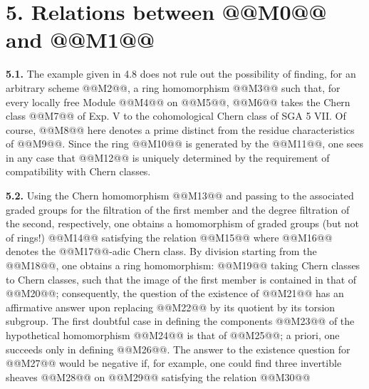 \section*{5. Relations between @@M0@@ and @@M1@@}

\textbf{5.1.} The example given in 4.8 does not rule out the possibility of finding, for an arbitrary scheme @@M2@@, a ring homomorphism
@@M3@@
such that, for every locally free Module @@M4@@ on @@M5@@, @@M6@@ takes the Chern class @@M7@@ of Exp. V to the cohomological Chern class of SGA 5 VII. Of course, @@M8@@ here denotes a prime distinct from the residue characteristics of @@M9@@. Since the ring @@M10@@ is generated by the @@M11@@, one sees in any case that @@M12@@ is uniquely determined by the requirement of compatibility with Chern classes.

\textbf{5.2.} Using the Chern homomorphism
@@M13@@
and passing to the associated graded groups for the filtration of the first member and the degree filtration of the second, respectively, one obtains a homomorphism of graded groups (but not of rings!)
@@M14@@
satisfying the relation
@@M15@@
where @@M16@@ denotes the @@M17@@-adic Chern class. By division starting from the @@M18@@, one obtains a ring homomorphism:
@@M19@@
taking Chern classes to Chern classes, such that the image of the first member is contained in that of @@M20@@; consequently, the question of the existence of @@M21@@ has an affirmative answer upon replacing @@M22@@ by its quotient by its torsion subgroup. The first doubtful case in defining the components @@M23@@ of the hypothetical homomorphism @@M24@@ is that of @@M25@@; a priori, one succeeds only in defining @@M26@@. The answer to the existence question for @@M27@@ would be negative if, for example, one could find three invertible sheaves @@M28@@ on @@M29@@ satisfying the relation
@@M30@@
